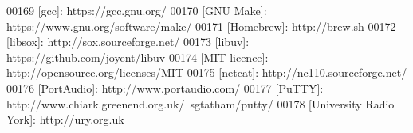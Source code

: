 \begin{DoxyCode}
00169 [gcc]:                   https:\textcolor{comment}{//gcc.gnu.org/}
00170 [GNU Make]:              https:\textcolor{comment}{//www.gnu.org/software/make/}
00171 [Homebrew]:              http:\textcolor{comment}{//brew.sh}
00172 [libsox]:                http:\textcolor{comment}{//sox.sourceforge.net/}
00173 [libuv]:                 https:\textcolor{comment}{//github.com/joyent/libuv}
00174 [MIT licence]:           http:\textcolor{comment}{//opensource.org/licenses/MIT}
00175 [netcat]:                http:\textcolor{comment}{//nc110.sourceforge.net/}
00176 [PortAudio]:             http:\textcolor{comment}{//www.portaudio.com/}
00177 [PuTTY]:                 http:\textcolor{comment}{//www.chiark.greenend.org.uk/~sgtatham/putty/}
00178 [University Radio York]: http:\textcolor{comment}{//ury.org.uk}
\end{DoxyCode}
